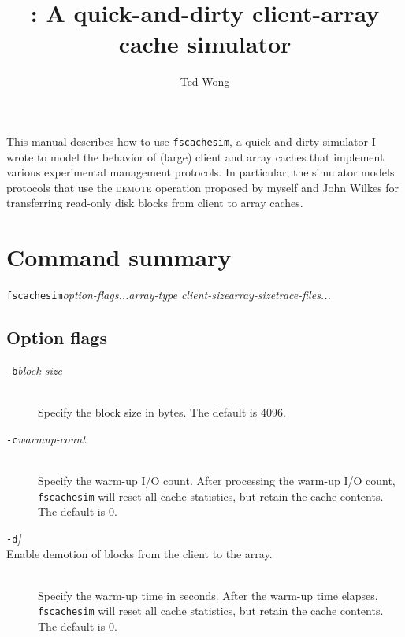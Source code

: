 \documentclass[twoside]{article}
\title{\fscachesim: A quick-and-dirty client-array cache simulator}
\author{Ted Wong}
\date{}
\newcommand{\fscachesim}{\texttt{fscachesim}}
\newcommand{\option}[2]{\texttt{#1}\textit{#2}}
\begin{document}
\maketitle

%
%
%

This manual describes how to use \fscachesim, a quick-and-dirty simulator I
wrote to model the behavior of (large) client and array caches that
implement various experimental management protocols. In particular, the
simulator models protocols that use the \textsc{demote} operation proposed
by myself and John Wilkes \cite{Wong2002} for transferring read-only disk
blocks from client to array caches.

%
%
%

\section{Command summary}

\fscachesim{}\quad \textit{option-flags...\quad array-type\quad
client-size\quad array-size\quad trace-files...}

\subsection{Option flags}

\begin{description}

\item[\option{-b}{\quad block-size}] \quad\\ Specify the block size in
bytes. The default is 4096.

\item[\option{-c}{\quad warmup-count}] \quad\\ Specify the warm-up
I/O count. After processing the warm-up I/O count, \fscachesim{} will reset
all cache statistics, but retain the cache contents. The default is 0.

\item[\option{-d}] \quad\\ Enable demotion of blocks from the client to the
array.

\item[\option{-m}] \quad\\ Read MAMBO-format trace files \cite{Uysal1997}.

\item[\option{-w}{\quad warmup-time}] \quad\\ Specify the warm-up
time in seconds. After the warm-up time elapses, \fscachesim{} will reset
all cache statistics, but retain the cache contents. The default is 0.

\end{description}
\end{document}
